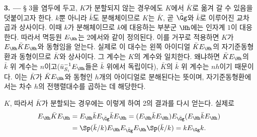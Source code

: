 
\medskip
\noindent\textbf{3. ---} § 3을 염두에 두고, $K$가 분할되지 않는 경우에도 $K$에서 $\bar K$로 옮겨 갈 수 있음을 덧붙이고자 한다. $k$뿐 아니라 $\bar k$도 분해체이므로 $K$는 $\bar K$, 곧 $\bar\Gg$와 $\bar k$로 이루어진 교차곱과 상사이다. 이때 $k$가 분해체이므로 $k$에 대응하는 부분군 $\Hh$에는 인자계 $1$이 대응한다. 따라서 멱등원 $E_\Hh$는 2에서와 같이 정의된다. 이를 거꾸로 적용하면 $K$가 $E_\Hh\bar K E_\Hh$와 동형임을 얻는다. 실제로 이 대수는 왼쪽 아이디얼 $\bar K E_\Hh$의 자기준동형환과 동형이므로 $\bar K$와 상사이다. 그 계수는 $K$의 계수와 일치한다. 왜냐하면 $\bar K E_\Hh$의 $\bar k$ 위 계수는 $n$이고($\bar u_{S_i}^{-1}E_\Hh$들은 $\bar k$ 위에서 독립이다), $\bar K$의 $\bar k$ 위 계수는 $nh$이기 때문이다. 이는 $\bar K$가 $\bar K E_\Hh$와 동형인 $h$개의 아이디얼로 분해된다는 뜻이며, 자기준동형환에서는 차수 $h$의 전행렬대수를 곱하는 데 해당한다.

$K$, 따라서 $\bar K$가 분할되는 경우에는 이렇게 하여 2의 결과를 다시 얻는다. 실제로
\[
\begin{aligned}
E_\Hh\bar K E_\Hh
 &=E_\Hh\bar kE_{\bar\Gg}\bar kE_\Hh
 =(E_\Hh\bar kE_\Hh)E_{\bar\Gg}(E_\Hh\bar kE_\Hh)\\
 &=\Sp(\bar k/k)E_\Hh E_{\bar\Gg}E_\Hh\Sp(\bar k/k)
 =kE_\Gg k.
\end{aligned}
\]
